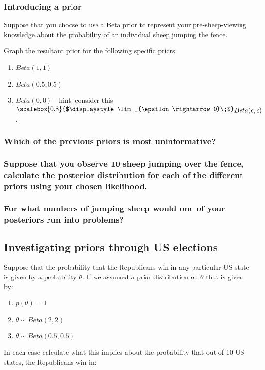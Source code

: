 \documentclass[11pt,fullpage]{book}
\newcommand{\Lim}[1]{\raisebox{0.5ex}{\scalebox{0.8}{$\displaystyle \lim_{#1}\;$}}}
\begin{document}
\subsubsection{Introducing a prior}
Suppose that you choose to use a Beta prior to represent your pre-sheep-viewing knowledge about the probability of an individual sheep jumping the fence. 

Graph the resultant prior for the following specific priors:

\begin{enumerate}
\item $Beta(1,1)$
\item $Beta(0.5,0.5)$
\item $Beta(0,0)$ - hint: consider this $\Lim{\epsilon \rightarrow 0} Beta(\epsilon,\epsilon)$.
\end{enumerate}

\subsubsection{Which of the previous priors is most uninformative?}
\subsubsection{Suppose that you observe 10 sheep jumping over the fence, calculate the posterior distribution for each of the different priors using your chosen likelihood.}
\subsubsection{For what numbers of jumping sheep would one of your posteriors run into problems?}

\subsection{Investigating priors through US elections}
Suppose that the probability that the Republicans win in any particular US state is given by a probability $\theta$. If we assumed a prior distribution on $\theta$ that is given by:

\begin{enumerate}
\item $p(\theta) = 1$
\item $\theta\sim Beta(2,2)$
\item $\theta\sim Beta(0.5,0.5)$
\end{enumerate}

In each case calculate what this implies about the probability that out of 10 US states, the Republicans win in:\\
\end{document}
